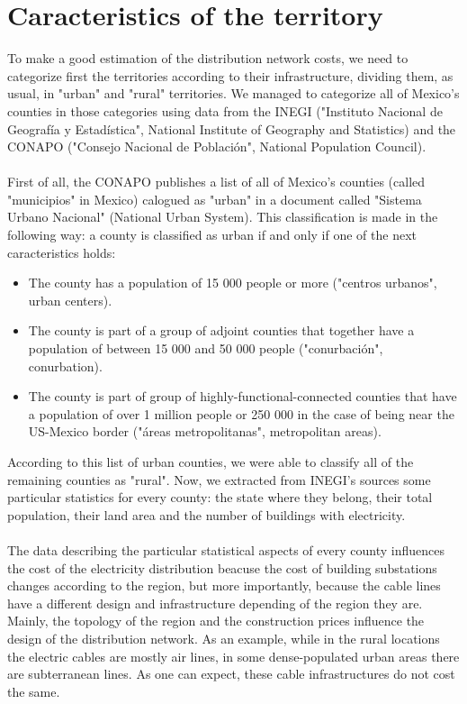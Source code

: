 \documentclass[•]{article}
\begin{document}
\section{Caracteristics of the territory}
To make a good estimation of the distribution network costs, we need to categorize first the territories according to their infrastructure, dividing them, as usual, in "urban" and "rural" territories. We managed to categorize all of Mexico's counties in those categories using data from the INEGI ("Instituto Nacional de Geografía y Estadística", National Institute of Geography and Statistics) and the CONAPO ("Consejo Nacional de Población", National Population Council).
\\
\\ First of all, the CONAPO publishes a list of all of Mexico's counties (called "municipios" in Mexico) calogued as "urban" in a document called "Sistema Urbano Nacional" (National Urban System)\cite{conapo}. This classification is made in the following way: a county is classified as urban if and only if one of the next caracteristics holds:
\begin{itemize}
\item The county has a population of 15 000 people or more ("centros urbanos", urban centers).
\item The county is part of a group of adjoint counties that together have a population of between 15 000 and 50 000 people ("conurbación", conurbation).
\item The county is part of group of highly-functional-connected counties that have a population of over 1 million people or 250 000 in the case of being near the US-Mexico border ("áreas metropolitanas", metropolitan areas).
\end{itemize}
According to this list of urban counties, we were able to classify all of the remaining counties as "rural". Now, we extracted from INEGI's sources some particular statistics for every county: the state where they belong, their total population, their land area and the number of buildings with electricity.\cite{inegi}
\\
\\The data describing the particular statistical aspects of every county influences the cost of the electricity distribution beacuse the cost of building substations changes according to the region, but more importantly, because the cable lines have a different design and infrastructure depending of the region they are. Mainly, the topology of the region and the construction prices influence the design of the distribution network. As an example, while in the rural locations the electric cables are mostly air lines, in some dense-populated urban areas there are subterranean lines. As one can expect, these cable infrastructures do not cost the same.
\end{document}
